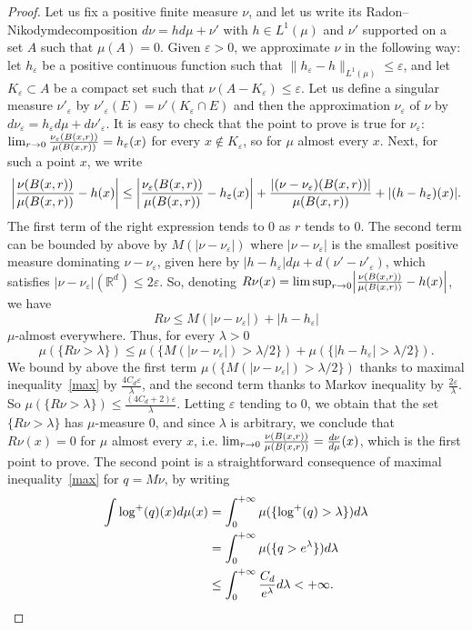 \documentclass[10pt]{amsart}
\theoremstyle{definition}\newtheorem{defi}[theo]{Definition}\newtheorem{rema}[theo]{Remark}\newtheorem{exam}[theo]{Example}\newtheorem{exem}[theo]{Example}\newtheorem{nota}[theo]{Notation}
\newcommand{\R}{\mathbb{R}}
\newcommand{\ep}{\varepsilon}
\renewcommand*{\to}{\mathchoice{\longrightarrow}{\rightarrow}{\rightarrow}{\rightarrow}}
\let\originalleft\left
\let\originalright\right
\renewcommand{\left}{\mathopen{}\mathclose\bgroup\originalleft}
\renewcommand{\right}{\aftergroup\egroup\originalright}
\begin{document}
\begin{proof}
Let us fix a positive finite measure $\nu$, and let us write its Radon--Nikodym\linebreak decomposition $d\nu=hd\mu+ \nu'$ with $h\in L^1(\mu)$ and $\nu'$ supported on a set $A$ such that $\mu(A)=0$. Given $\ep>0$, we approximate $\nu$ in the following way: let $h_\ep$ be a positive continuous function such that $\|h_\ep-h\|_{L^1(\mu)}\leq \ep$, and let $K_\ep\subset A$ be a compact set such that $\nu(A-K_\ep)\leq \ep$. Let us define a singular measure $\nu'_\ep$ by $\nu'_\ep(E)=\nu'(K_\ep\cap E)$ and then the approximation $\nu_\ep$ of $\nu$ by $d\nu_\ep= h_\ep d\mu+ d\nu'_\ep$. It is easy to check that the point to prove is true for $\nu_\ep$: $\lim_{r\to 0}\frac{\nu_\ep(B(x,r))}{\mu(B(x,r))}=h_\ep(x)$ for every $x\not\in K_\ep$, so for $\mu$ almost every $x$. Next, for such a point $x$, we write
\[
\left|\frac{\nu(B(x,r))}{\mu(B(x,r))}-h(x)\right|\leq \left|\frac{\nu_\ep(B(x,r))}{\mu(B(x,r))}-h_\ep(x)\right|+\frac{|(\nu-\nu_\ep)(B(x,r))|}{\mu(B(x,r))}+|(h-h_\ep)(x)|.
\]
The first term of the right expression tends to $0$ as $r$ tends to $0$. The second term can be bounded by above by $M(|\nu-\nu_\ep|)$ where $|\nu-\nu_\ep|$ is the smallest positive measure dominating $\nu-\nu_\ep$, given here by $|h-h_\ep|d\mu+d(\nu'-\nu'_\ep)$, which satisfies $|\nu-\nu_\ep|(\R^d)\leq 2\ep$. So, denoting $R\nu(x)=\limsup_{r\to 0} \left|\frac{\nu(B(x,r))}{\mu(B(x,r))}-h(x)\right|$, we have
\[
R\nu\leq M(|\nu-\nu_\ep|)+|h-h_\ep|
\]
$\mu$-almost everywhere. Thus, for every $\lambda>0$
\[
\mu(\{R\nu>\lambda\})\leq \mu(\{M(|\nu-\nu_\ep|)>\lambda/2\})+\mu(\{|h-h_\ep|>\lambda/2\}).
\]
We bound by above the first term $\mu(\{M(|\nu-\nu_\ep|)>\lambda/2\})$ thanks to maximal inequality~\eqref{max} by $\frac{4C_d\ep}{\lambda}$, and the second term thanks to Markov inequality by $\frac{2\ep}{\lambda}$. So $\mu(\{R\nu>\lambda\})\leq \frac{(4C_d+2)\ep}{\lambda}$. Letting $\ep$ tending to $0$, we obtain that the set $\{R\nu>\lambda\}$ has $\mu$-measure $0$, and since $\lambda$ is arbitrary, we conclude that $R\nu(x)=0$ for $\mu$ almost every $x$, i.e. $\lim_{ r\to 0 } \frac{\nu(B(x,r))}{\mu(B(x,r))}=\frac{d\nu}{d \mu}(x)$, which is the first point to prove. The second point is a straightforward consequence of maximal inequality~\eqref{max} for $q=M\nu$, by writing
\begin{align*}
 \int \log^{+}(q)(x) d\mu(x) &=  \int_0^{+\infty} \mu(\{\log^{+}(q)>\lambda\})d\lambda \\
&=  \int_0^{+\infty} \mu(\{q>e^\lambda\})d\lambda \\
&\leq  \int_0^{+\infty} \frac{C_d}{e^{\lambda}}d \lambda < +\infty.\qedhere
\end{align*}
\end{proof}
\end{document}
